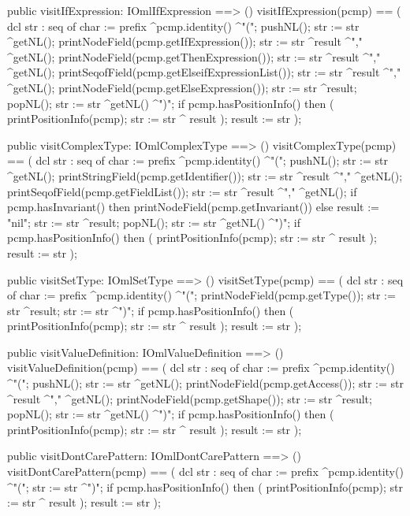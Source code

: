 \begin{vdm_al}
  public visitIfExpression: IOmlIfExpression ==> ()
  visitIfExpression(pcmp) ==
    ( dcl str : seq of char := prefix ^pcmp.identity() ^"(";
      pushNL();
      str := str ^getNL();
      printNodeField(pcmp.getIfExpression());
      str := str ^result ^"," ^getNL();
      printNodeField(pcmp.getThenExpression());
      str := str ^result ^"," ^getNL();
      printSeqofField(pcmp.getElseifExpressionList());
      str := str ^result ^"," ^getNL();
      printNodeField(pcmp.getElseExpression());
      str := str ^result;
      popNL();
      str := str ^getNL() ^")";
      if pcmp.hasPositionInfo()
      then ( printPositionInfo(pcmp);
             str := str ^ result );
      result := str );

  public visitComplexType: IOmlComplexType ==> ()
  visitComplexType(pcmp) ==
    ( dcl str : seq of char := prefix ^pcmp.identity() ^"(";
      pushNL();
      str := str ^getNL();
      printStringField(pcmp.getIdentifier());
      str := str ^result ^"," ^getNL();
      printSeqofField(pcmp.getFieldList());
      str := str ^result ^"," ^getNL();
      if pcmp.hasInvariant()
      then printNodeField(pcmp.getInvariant())
      else result := "nil";
      str := str ^result;
      popNL();
      str := str ^getNL() ^")";
      if pcmp.hasPositionInfo()
      then ( printPositionInfo(pcmp);
             str := str ^ result );
      result := str );

  public visitSetType: IOmlSetType ==> ()
  visitSetType(pcmp) ==
    ( dcl str : seq of char := prefix ^pcmp.identity() ^"(";
      printNodeField(pcmp.getType());
      str := str ^result;
      str := str ^")";
      if pcmp.hasPositionInfo()
      then ( printPositionInfo(pcmp);
             str := str ^ result );
      result := str );

  public visitValueDefinition: IOmlValueDefinition ==> ()
  visitValueDefinition(pcmp) ==
    ( dcl str : seq of char := prefix ^pcmp.identity() ^"(";
      pushNL();
      str := str ^getNL();
      printNodeField(pcmp.getAccess());
      str := str ^result ^"," ^getNL();
      printNodeField(pcmp.getShape());
      str := str ^result;
      popNL();
      str := str ^getNL() ^")";
      if pcmp.hasPositionInfo()
      then ( printPositionInfo(pcmp);
             str := str ^ result );
      result := str );

  public visitDontCarePattern: IOmlDontCarePattern ==> ()
  visitDontCarePattern(pcmp) ==
    ( dcl str : seq of char := prefix ^pcmp.identity() ^"(";
      str := str ^")";
      if pcmp.hasPositionInfo()
      then ( printPositionInfo(pcmp);
             str := str ^ result );
      result := str );


\end{vdm_al}
